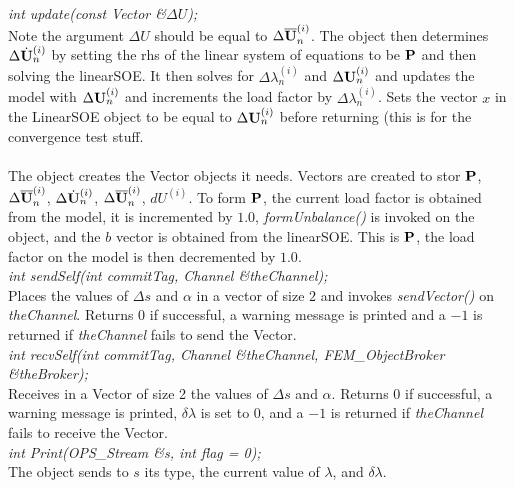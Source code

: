 {\em int update(const Vector \&$\Delta U$);} \\
Note the argument $\Delta U$ should be equal to $\Delta \Ub_n^{(i)}$.
The object then determines $\Delta \Uh_n^{(i)}$ by setting the rhs of
the linear system of equations to be $\P$ and then solving the
linearSOE. It then solves for
$\Delta \lambda_n^{(i)}$ and $\Delta \U_n^{(i)}$ and updates the model with
$\Delta \U_n^{(i)}$ and increments the load factor by $\Delta
\lambda_n^{(i)}$. Sets the vector $x$ in the LinearSOE object to be
equal to $\Delta \U_n^{(i)}$ before returning (this is for the
convergence test stuff. \\


\\ 
The object creates the Vector objects it needs. Vectors are created to
stor $\P$, $\Delta \Ub_n^{(i)}$, $\Delta \Uh_n^{(i)}$, $\Delta
\Ub_n^{(i)}$, $dU^{(i)}$. To form $\P$, the current load factor is
obtained from the model, it is incremented by $1.0$, {\em
formUnbalance()} is invoked on the object, and the $b$ vector is
obtained from the linearSOE. This is $\P$, the load factor on the
model is then decremented by $1.0$. \\

{\em int sendSelf(int commitTag, Channel \&theChannel); } \\ 
Places the values of $\Delta s$ and $\alpha$ in a
vector of size $2$ and invokes {\em sendVector()} on {\em theChannel}.
Returns $0$ if successful, a warning message is printed and
a $-1$ is returned if {\em theChannel} fails to send the Vector. \\

{\em int recvSelf(int commitTag, Channel \&theChannel, 
FEM\_ObjectBroker \&theBroker); } \\ 
Receives in a Vector of size 2 the values of $\Delta s$ and $\alpha$.
Returns $0$ if successful, a warning message is printed, $\delta
\lambda$ is set to $0$, and a $-1$ is returned if {\em theChannel}
fails to receive the Vector.\\

{\em int Print(OPS\_Stream \&s, int flag = 0);}\\
The object sends to $s$ its type, the current value of $\lambda$, and
$\delta \lambda$. 